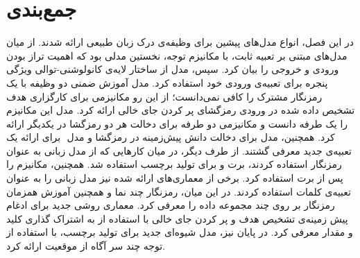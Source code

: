\section{جمع‌بندی}
در این فصل، انواع مدل‌های پیشین برای وظیفه‌ی درک زبان طبیعی ارائه شدند. از میان مدل‌های مبتنی بر تعبیه ثابت،  \cite{aligned_lstm_atten_nlu} با مکانیزم توجه، نخستین مدلی بود که اهمیت تراز بودن ورودی و خروجی را بیان کرد. سپس، مدل  \cite{Wang:18} از ساختار لایه‌ی کانولوشنی-توالی ویژگی پنجره برای تعبیه‌ی ورودی خود استفاده کرد. مدل  \cite{goo-etal-2018-slot} آموزش ضمنی دو وظیفه با یک رمزنگار مشترک را کافی نمی‌دانست؛ از این رو مکانیزمی برای کارگزاری هدف تشخیص داده شده در ورودی رمزگشای پر کردن جای خالی ارائه کرد. مدل  \cite{e:2019} این مکانیزم را یک طرفه دانست و مکانیزمی دو طرفه برای دخالت هر دو رمزگشا در یکدیگر ارائه کرد. همچنین، مدل  \cite{priorknowledge} برای دخالت دانش پیش‌زمینه در رمزگشا و مدل ‌ \cite{Firdaus:2021} برای ارائه یک تعبیه‌ی جدید معرفی گشتند. از طرف دیگر، در میان کارهایی که از مدل زبانی به عنوان رمزنگار استفاده کردند، برت و  \cite{chen:2019} برای تولید برچسب استفاده شد. همچنین،  \cite{Wang:2020} مکانیزم  را پس از برت استفاده کرد. برخی از معماری‌های ارائه شده نیز مدل زبانی را به عنوان تعبیه‌ی کلمات استفاده کردند. در این میان،  \cite{huang:2020} رمزنگار چند نما و همچنین آموزش همزمان رمزنگار بر روی چند مجموعه داده را معرفی کرد. معماری  \cite{Qin:2021} روشی جدید برای ادغام پیش زمینه‌ی تشخیص هدف و پر کردن جای خالی با استفاده از به اشتراک گذاری کلید و مقدار معرفی کرد. در پایان نیز، مدل  \cite{yang:2021} شیوه‌ای جدید برای تولید برچسب، با استفاده از توجه چند سر آگاه از موقعیت ارائه کرد.





